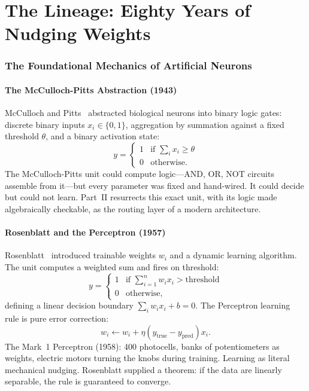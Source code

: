 \documentclass[11pt,letterpaper]{article}
\begin{document}
\tableofcontents
\newpage

\part{The Lineage: Eighty Years of Nudging Weights}

\section{The Foundational Mechanics of Artificial Neurons}

\subsection{The McCulloch-Pitts Abstraction (1943)}

McCulloch and Pitts~\cite{mcculloch1943} abstracted biological neurons into
binary logic gates: discrete binary inputs $x_i \in \{0,1\}$, aggregation by
summation against a fixed threshold $\theta$, and a binary activation state:
\[
y = \begin{cases} 1 & \text{if } \sum_i x_i \geq \theta \\ 0 & \text{otherwise.} \end{cases}
\]
The McCulloch-Pitts unit could compute logic---AND, OR, NOT circuits assemble
from it---but every parameter was fixed and hand-wired.  It could decide but
could not learn.  Part~II resurrects this exact unit, with its logic made
algebraically checkable, as the routing layer of a modern architecture.

\subsection{Rosenblatt and the Perceptron (1957)}

Rosenblatt~\cite{rosenblatt1958} introduced trainable weights $w_i$ and a
dynamic learning algorithm.  The unit computes a weighted sum and fires on
threshold:
\[
y = \begin{cases} 1 & \text{if } \sum_{i=1}^n w_i x_i > \text{threshold} \\
                   0 & \text{otherwise,} \end{cases}
\]
defining a linear decision boundary $\sum_i w_i x_i + b = 0$.
The Perceptron learning rule is pure error correction:
\[
w_i \leftarrow w_i + \eta(y_{\text{true}} - y_{\text{pred}})x_i.
\]
The Mark~1 Perceptron (1958): 400 photocells, banks of potentiometers as
weights, electric motors turning the knobs during training.  Learning as
literal mechanical nudging.  Rosenblatt supplied a theorem: if the data are
linearly separable, the rule is guaranteed to converge.
\end{document}
